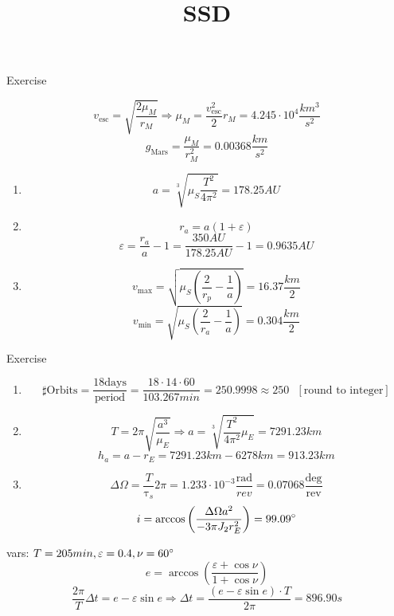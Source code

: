 \documentclass[a4paper,10pt]{article}
\title{SSD}
\author{}
\date{}
\begin{document}
\maketitle
\begin{section}{Exercise}
\setcounter{subsection}{2}
 \begin{subsection}{}
  \[v_\text{esc} = \sqrt{\frac{2\mu_M}{r_M}} \Rightarrow \mu_M = \frac{v_\text{esc}^2}{2} r_M = 4.245\cdot10^4 \frac{km^3}{s^2}\]
  \[g_\text{Mars} = \frac{\mu_M}{r_M^2} = 0.00368\frac{km}{s^2}\]
 \end{subsection}
 
 \setcounter{subsection}{5}
 \begin{subsection}{}
 \begin{enumerate}[1)]
  \item \[ a= \sqrt[3]{\mu_S \frac{T^2}{4\pi^2}} = 178.25 AU \]
  \item \[ r_a = a(1+\varepsilon) \] \[ \varepsilon = \frac{r_a}{a} -1 = \frac{350 AU}{178.25 AU} -1 = 0.9635 AU\]
  \item \[ v_\text{max} = \sqrt{\mu_S \left( \frac{2}{r_p} - \frac{1}{a} \right)} = 16.37 \frac{km}{2} \]
  \[ v_\text{min} = \sqrt{\mu_S \left( \frac{2}{r_a} - \frac{1}{a} \right)} = 0.304 \frac{km}{2} \]
 \end{enumerate}
 \end{subsection}
\end{section}
\setcounter{section}{3}
\begin{section}{Exercise}
 \begin{subsection}{}
  \begin{enumerate}[1)]
   \item \[ \sharp\text{Orbits} = \frac{18 \text{days}}{\text{period}} = \frac{18\cdot14\cdot60}{103.267min} = 250.9998 \approx 250 ~~~[\text{round to integer}]\]
   \item \[ T = 2\pi\sqrt{\frac{a^3}{\mu_E}} \Rightarrow a = \sqrt[3]{\frac{T^2}{4\pi^2}\mu_E} = 7291.23 km \]
   \[ h_a = a - r_E = 7291.23 km - 6278 km = 913.23 km \]
   \item \[ \Delta \Omega = \frac{T}{\uptau_s}2\pi = 1.233\cdot 10^{-3} \frac{\text{rad}}{rev} = 0.07068 \frac{\text{deg}}{\text{rev}}\]
   \[ i = \arccos \left( \frac{\Delta\Omega a^2}{-3\pi J_2 r_E^2} \right) = 99.09\degree\]
  \end{enumerate}
 \end{subsection}
 \setcounter{subsection}{2}
 \begin{subsection}{}
  vars: $T=205min, \varepsilon = 0.4,\nu = 60 \degree$
  \[ e = \arccos \left( \frac{\varepsilon + \cos \nu}{1+\cos\nu} \right) \]
  \[ \frac{2\pi}{T}\Delta t = e - \varepsilon\sin e \Rightarrow \Delta t = \frac{(e-\varepsilon\sin e)\cdot T}{2\pi} = 896.90s\]
 \end{subsection}
\end{section}
\end{document}
